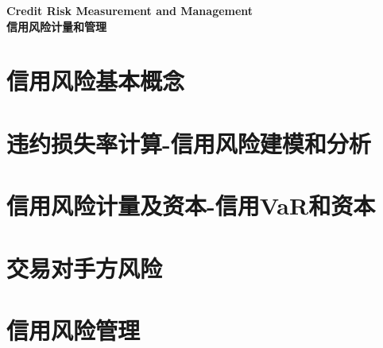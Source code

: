 \documentclass{article}
\begin{document}

\graphicspath{{images/}}

\begin{center}
\textbf{\Huge Credit Risk Measurement and Management}\\
\textbf{\Huge 信用风险计量和管理}\\
\end{center}
\section{信用风险基本概念}


\section{违约损失率计算-信用风险建模和分析}


\section{信用风险计量及资本-信用VaR和资本}


\section{交易对手方风险}


\section{信用风险管理}


%
\end{document}
